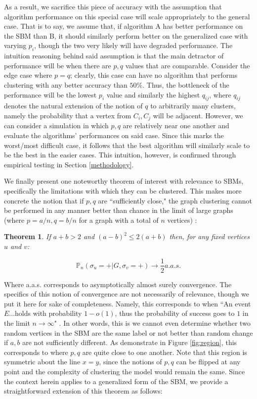 \documentclass[journal]{IEEEtran}
\newtheorem{theorem}{Theorem}[section]
\begin{document}
As a result, we sacrifice this piece of accuracy with the assumption that algorithm performance on this special case will scale appropriately to the general case. That is to say, we assume that, if algorithm A has better performance on the SBM than B, it should similarly perform better on the generalized case with varying $p_i$, though the two very likely will have degraded performance. The intuition reasoning behind said assumption is that the main detractor of performance will be when there are $p,q$ values that are comparable. Consider the edge case where $p=q$; clearly, this case can have no algorithm that performs clustering with any better accuracy than $50\%$. Thus, the bottleneck of the performance will be the lowest $p_i$ value and similarly the highest $q_{ij}$, where $q_{ij}$ denotes the natural extension of the notion of $q$ to arbitrarily many clusters, namely the probability that a vertex from $C_i,C_j$ will be adjacent. However, we can consider a simulation in which $p,q$ are relatively near one another and evaluate the algorithms' performances on said case. Since this marks the worst/most difficult case, it follows that the best algorithm will similarly scale to be the best in the easier cases. This intuition, however, is confirmed through empirical testing in Section \ref{methodology}.

We finally present one noteworthy theorem of interest with relevance to SBMs, specifically the limitations with which they can be clustered. This makes more concrete the notion that if $p,q$ are ``sufficiently close," the graph clustering cannot be performed in any manner better than chance in the limit of large graphs (where $p=a/n,q=b/n$ for a graph with a total of $n$ vertices) \cite{sbm}:

\begin{theorem}
If $a + b > 2$ and $(a-b)^2\le2(a+b)$ then, for any fixed vertices $u$ and $v$:

$$ \mathbb{P}_n(\sigma_u = + | G, \sigma_v = +) \rightarrow \frac{1}{2} a.a.s. $$
\end{theorem}

Where a.a.s. corresponds to asymptotically almost surely convergence. The specifics of this notion of convergence are not necessarily of relevance, though we put it here for sake of completeness. Namely, this corresponds to when ``An event $E$...holds with probability $1-o(1)$, thus the probability of success goes to $1$ in the limit $n\rightarrow\infty$" \cite{terry}. In other words, this is we cannot even determine whether two random vertices in the SBM are the same label or not better than random change if $a,b$ are not sufficiently different. As demonstrate in Figure \ref{fig:region}, this corresponds to where $p,q$ are quite close to one another. Note that this region is symmetric about the line $x=y$, since the notions of $p,q$ can be flipped at any point and the complexity of clustering the model would remain the same. Since the context herein applies to a generalized form of the SBM, we provide a straightforward extension of this theorem as follows:
\end{document}
